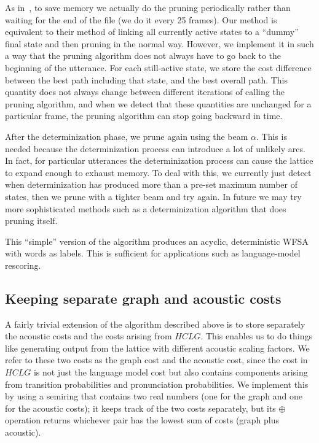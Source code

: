 \documentclass{article}
\def\HCLG{{\mathit{HCLG}}}
\begin{document}
As in~\cite{efficient_general}, to save memory we actually do the pruning
periodically rather than waiting for the end of the file (we do it every 25 frames).
Our method is equivalent to their method of linking all currently active states to a ``dummy''
final state and then pruning in the normal way.  However, we implement it in such a way
that the pruning algorithm does not always have to go back to the beginning of the utterance.
For each still-active state, we store the cost difference between the best path including that
state, and the best overall path.  This quantity does not always change between different
iterations of calling the pruning algorithm, and when we detect that these quantities are 
unchanged for a particular frame, the pruning algorithm can stop going backward in time.

After the determinization phase, we prune again using the beam $\alpha$.  This is needed because
the determinization process can introduce a lot of unlikely arcs.  In fact, for particular
utterances the determinization process can cause the lattice to expand enough to
exhaust memory.  To deal with this, we currently just detect when determinization
has produced more than a pre-set maximum number of states, then we prune with a tighter
beam and try again.  In future we may try more sophisticated methods such as a
determinization algorithm that does pruning itself.

This ``simple'' version of the algorithm produces an acyclic, deterministic
WFSA with words as labels.  This is sufficient for applications such as language-model
rescoring.


\subsection{Keeping separate graph and acoustic costs}

A fairly trivial extension of the algorithm described above is to store separately
the acoustic costs and the costs arising from $\HCLG$.  This enables us to do things
like generating output from the lattice with different acoustic scaling factors.
We refer to these two costs as the graph cost and the acoustic cost, since the cost
in $\HCLG$ is not just the language model cost but also contains components
arising from transition probabilities and pronunciation probabilities.  We implement
this by using a semiring that contains two real numbers (one for the graph and one
for the acoustic costs); it keeps track of the two costs separately, but its
$\oplus$ operation returns whichever pair has the lowest sum of costs (graph plus acoustic).
\end{document}

